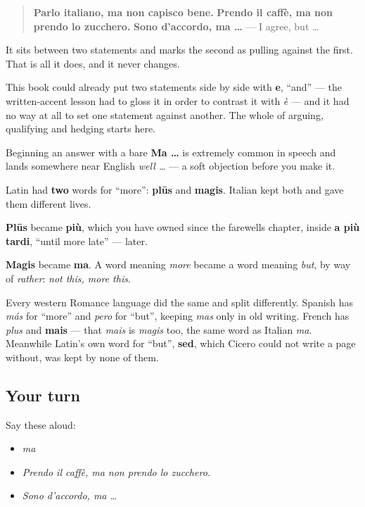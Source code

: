 \begin{quote}
\textbf{Parlo italiano, ma non capisco bene.} \textbf{Prendo il caffè, ma non prendo lo zucchero.} \textbf{Sono d'accordo, ma …} — I agree, but …
\end{quote}

It sits between two statements and marks the second as pulling against the first. That is all it does, and it never changes.

This book could already put two statements side by side with \textbf{e}, \textquotedblleft{}and\textquotedblright{} — the written-accent lesson had to gloss it in order to contrast it with \emph{è} — and it had no way at all to set one statement against another. The whole of arguing, qualifying and hedging starts here.

Beginning an answer with a bare \textbf{Ma …} is extremely common in speech and lands somewhere near English \emph{well …} — a soft objection before you make it.

\begin{cousinweb}
Latin had \textbf{two} words for \textquotedblleft{}more\textquotedblright{}: \textbf{plūs} and \textbf{magis}. Italian kept both and gave them different lives.

\textbf{Plūs} became \textbf{più}, which you have owned since the farewells chapter, inside \textbf{a più tardi}, \textquotedblleft{}until more late\textquotedblright{} — later.

\textbf{Magis} became \textbf{ma}. A word meaning \emph{more} became a word meaning \emph{but}, by way of \emph{rather}: \emph{not this, more this}.

Every western Romance language did the same and split differently. Spanish has \emph{más} for \textquotedblleft{}more\textquotedblright{} and \emph{pero} for \textquotedblleft{}but\textquotedblright{}, keeping \emph{mas} only in old writing. French has \emph{plus} and \textbf{mais} — that \emph{mais} is \emph{magis} too, the same word as Italian \emph{ma}. Meanwhile Latin's own word for \textquotedblleft{}but\textquotedblright{}, \textbf{sed}, which Cicero could not write a page without, was kept by none of them.
\end{cousinweb}

\subsection*{Your turn}
Say these aloud:

\begin{itemize}
\raggedright
  \item \emph{ma}
  \item \emph{Prendo il caffè, ma non prendo lo zucchero.}
  \item \emph{Sono d'accordo, ma …}
\end{itemize}

